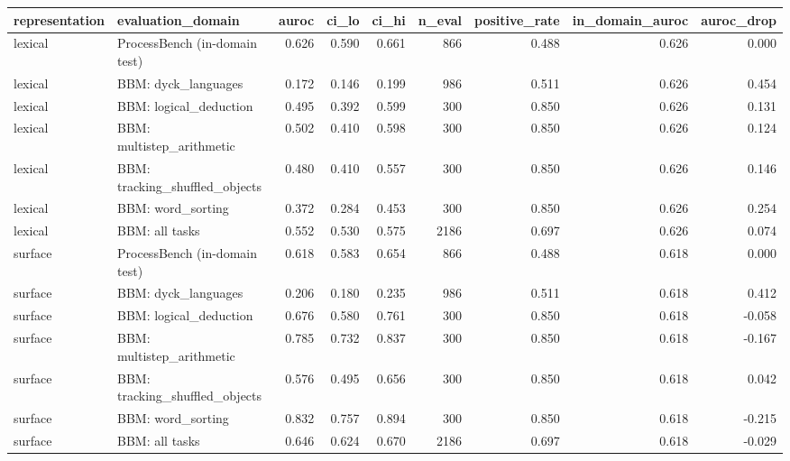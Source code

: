 \begin{tabular}{llrrrrrrr}
\toprule
representation & evaluation_domain & auroc & ci_lo & ci_hi & n_eval & positive_rate & in_domain_auroc & auroc_drop \\
\midrule
lexical & ProcessBench (in-domain test) & 0.626 & 0.590 & 0.661 & 866 & 0.488 & 0.626 & 0.000 \\
lexical & BBM: dyck_languages & 0.172 & 0.146 & 0.199 & 986 & 0.511 & 0.626 & 0.454 \\
lexical & BBM: logical_deduction & 0.495 & 0.392 & 0.599 & 300 & 0.850 & 0.626 & 0.131 \\
lexical & BBM: multistep_arithmetic & 0.502 & 0.410 & 0.598 & 300 & 0.850 & 0.626 & 0.124 \\
lexical & BBM: tracking_shuffled_objects & 0.480 & 0.410 & 0.557 & 300 & 0.850 & 0.626 & 0.146 \\
lexical & BBM: word_sorting & 0.372 & 0.284 & 0.453 & 300 & 0.850 & 0.626 & 0.254 \\
lexical & BBM: all tasks & 0.552 & 0.530 & 0.575 & 2186 & 0.697 & 0.626 & 0.074 \\
surface & ProcessBench (in-domain test) & 0.618 & 0.583 & 0.654 & 866 & 0.488 & 0.618 & 0.000 \\
surface & BBM: dyck_languages & 0.206 & 0.180 & 0.235 & 986 & 0.511 & 0.618 & 0.412 \\
surface & BBM: logical_deduction & 0.676 & 0.580 & 0.761 & 300 & 0.850 & 0.618 & -0.058 \\
surface & BBM: multistep_arithmetic & 0.785 & 0.732 & 0.837 & 300 & 0.850 & 0.618 & -0.167 \\
surface & BBM: tracking_shuffled_objects & 0.576 & 0.495 & 0.656 & 300 & 0.850 & 0.618 & 0.042 \\
surface & BBM: word_sorting & 0.832 & 0.757 & 0.894 & 300 & 0.850 & 0.618 & -0.215 \\
surface & BBM: all tasks & 0.646 & 0.624 & 0.670 & 2186 & 0.697 & 0.618 & -0.029 \\
\bottomrule
\end{tabular}
